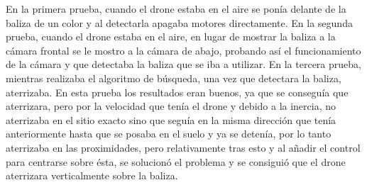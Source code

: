 \hspace{1cm} En la primera prueba, cuando el drone estaba en el aire se pon\'ia delante de la baliza de un color y al detectarla apagaba motores directamente. En la segunda prueba, cuando el drone estaba en el aire, en lugar de mostrar la baliza a la c\'amara frontal se le mostro a la c\'amara de abajo, probando as\'i el funcionamiento de la c\'amara y que detectaba la baliza que se iba a utilizar. En la tercera prueba, mientras realizaba el algoritmo de b\'usqueda, una vez que detectara la baliza, aterrizaba. En esta prueba los resultados eran buenos, ya que se consegu\'ia que aterrizara, pero por la velocidad que ten\'ia el drone y debido a la inercia, no aterrizaba en el sitio exacto sino que segu\'ia en la misma direcci\'on que ten\'ia anteriormente hasta que se posaba en el suelo y ya se deten\'ia, por lo tanto aterrizaba en las proximidades, pero relativamente tras esto y al añadir el control para centrarse sobre \'esta, se solucion\'o el problema y se consigui\'o que el drone aterrizara verticalmente sobre la baliza. 


